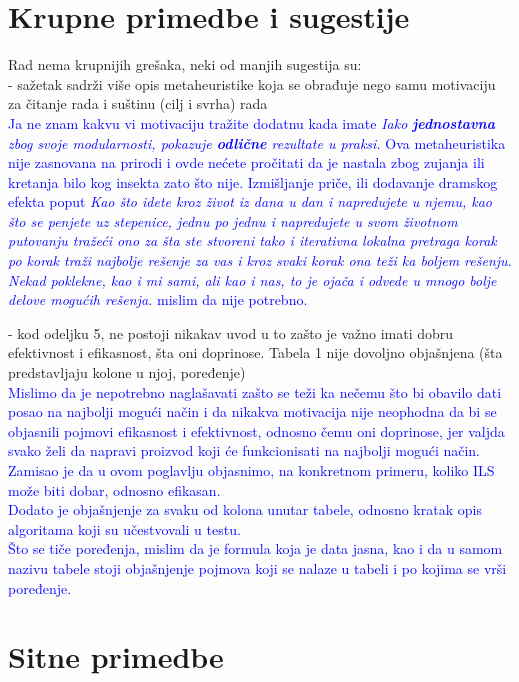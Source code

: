 \documentclass[a4paper]{report}
\newcommand{\odgovor}[1]{\textcolor{blue}{#1}}
\begin{document}
\section{Krupne primedbe i sugestije}

Rad nema krupnijih grešaka, neki od manjih sugestija su:\\
- sažetak sadrži više opis metaheuristike koja se obrađuje nego samu motivaciju za čitanje rada i suštinu (cilj i svrha) rada\\
\odgovor{Ja ne znam kakvu vi motivaciju tražite dodatnu kada imate \textit{Iako \textbf{jednostavna} zbog svoje modularnosti, pokazuje \textbf{odlične} rezultate u praksi.} Ova metaheuristika nije zasnovana na prirodi i ovde nećete pročitati 
da je nastala zbog zujanja ili kretanja bilo kog insekta zato što nije. Izmišljanje priče, ili dodavanje dramskog efekta poput \textit{Kao što idete kroz život iz dana u dan i napredujete u njemu, kao što se penjete uz stepenice, jednu po jednu i napredujete u svom životnom putovanju tražeći ono za šta ste stvoreni tako i iterativna lokalna pretraga korak po korak traži najbolje rešenje za vas i kroz 
svaki korak ona teži ka boljem rešenju. Nekad poklekne, kao i mi sami, ali kao i nas, to je ojača i odvede u mnogo bolje delove mogućih rešenja.} mislim da nije potrebno.\\}

- kod odeljku 5, ne postoji nikakav uvod u to zašto je važno imati dobru efektivnost i efikasnost, šta oni doprinose. Tabela 1 nije dovoljno objašnjena (šta predstavljaju kolone u njoj, poređenje) \\
\odgovor{Mislimo da je nepotrebno naglašavati zašto se teži ka nečemu što bi obavilo dati posao na najbolji mogući način i da nikakva motivacija nije neophodna da bi se objasnili pojmovi efikasnost i efektivnost, odnosno čemu oni doprinose, jer valjda svako želi da napravi proizvod koji će funkcionisati na najbolji mogući način. Zamisao je da u ovom poglavlju objasnimo, na konkretnom primeru, koliko ILS može biti dobar, odnosno efikasan.\\
Dodato je objašnjenje za svaku od kolona unutar tabele, odnosno kratak opis algoritama koji su učestvovali u testu.\\
Što se tiče poređenja, mislim da je formula koja je data jasna, kao i da u samom nazivu tabele stoji objašnjenje pojmova koji se nalaze u tabeli i po kojima se vrši poređenje.\\}


\section{Sitne primedbe}
\end{document}
